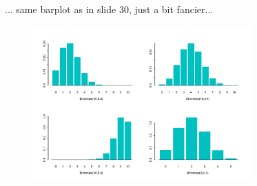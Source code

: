 \documentclass[smaller, handout]{beamer}\usepackage[]{graphicx}\usepackage[]{color}
\newtheorem{remark}{Remark}[section]
\begin{document}
%
%


\begin{frame}{\secname}%


... same barplot as in slide 30, just a bit fancier...

\begin{figure}[ptb]\centering
\includegraphics[width=0.75\textwidth,height=0.6\textheight]{img/distbin.pdf}
\end{figure}
\end{frame}%
\end{document}

